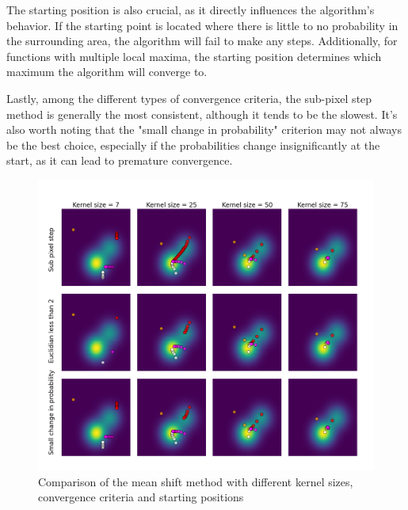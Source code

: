 \documentclass[9pt]{IEEEtran}
\begin{document}
     The starting position is also crucial, as it directly influences the algorithm's
      behavior. If the starting point is located where there is little to no
       probability in the surrounding area, the algorithm will fail to make any 
       steps. Additionally, for functions with multiple local maxima, the starting
        position determines which maximum the algorithm will converge to. 

        Lastly, among the different types of convergence criteria, the sub-pixel 
        step method is generally the most consistent, although it tends to be the
         slowest. It's also worth noting that the "small change in probability" 
         criterion may not always be the best choice, especially if the probabilities 
         change insignificantly at the start, as it can lead to premature convergence. 

\begin{figure}[h]
    \centering
    \includegraphics[width=0.99\columnwidth]{figures/mode_seeking.png}
    \caption{Comparison of the mean shift method with different kernel sizes, convergence
    criteria and starting positions}
    \label{fig:mode_seeking}
\end{figure}
\end{document}
